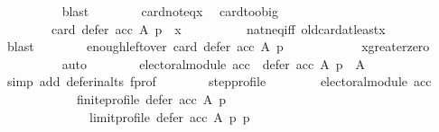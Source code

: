 \begin{isabellebody}
\ \ \ \ \ \ \ \ \isamarkupfalse%
\ blast\isanewline
\ \ \ \ \ \ \isamarkupfalse%
\ card{\isacharunderscore}{\kern0pt}not{\isacharunderscore}{\kern0pt}eq{\isacharunderscore}{\kern0pt}x\ \isamarkupfalse%
\ card{\isacharunderscore}{\kern0pt}too{\isacharunderscore}{\kern0pt}big{\isacharcolon}{\kern0pt}\isanewline
\ \ \ \ \ \ \ \ {\isachardoublequoteopen}card\ {\isacharparenleft}{\kern0pt}defer\ acc\ A\ p{\isacharparenright}{\kern0pt}\ {\isachargreater}{\kern0pt}\ x{\isachardoublequoteclose}\isanewline
\ \ \ \ \ \ \ \ \isamarkupfalse%
\ nat{\isacharunderscore}{\kern0pt}neq{\isacharunderscore}{\kern0pt}iff\ old{\isacharunderscore}{\kern0pt}card{\isacharunderscore}{\kern0pt}at{\isacharunderscore}{\kern0pt}least{\isacharunderscore}{\kern0pt}x\isanewline
\ \ \ \ \ \ \ \ \isamarkupfalse%
\ blast\isanewline
\ \ \ \ \ \ \isamarkupfalse%
\ enough{\isacharunderscore}{\kern0pt}leftover{\isacharcolon}{\kern0pt}\ {\isachardoublequoteopen}card\ {\isacharparenleft}{\kern0pt}defer\ acc\ A\ p{\isacharparenright}{\kern0pt}\ {\isachargreater}{\kern0pt}\ {}{\isachardoublequoteclose}\isanewline
\ \ \ \ \ \ \ \ \isamarkupfalse%
\ x{\isacharunderscore}{\kern0pt}greater{\isacharunderscore}{\kern0pt}zero\isanewline
\ \ \ \ \ \ \ \ \isamarkupfalse%
\ auto\isanewline
\ \ \ \ \ \ \isamarkupfalse%
\ {\isachardoublequoteopen}electoral{\isacharunderscore}{\kern0pt}module\ acc\ {\isasymlongrightarrow}\ {\isacharparenleft}{\kern0pt}defer\ acc\ A\ p{\isacharparenright}{\kern0pt}\ {\isasymsubseteq}\ A{\isachardoublequoteclose}\isanewline
\ \ \ \ \ \ \ \ \isamarkupfalse%
\ {\isacharparenleft}{\kern0pt}simp\ add{\isacharcolon}{\kern0pt}\ defer{\isacharunderscore}{\kern0pt}in{\isacharunderscore}{\kern0pt}alts\ f{\isacharunderscore}{\kern0pt}prof{\isacharparenright}{\kern0pt}\isanewline
\ \ \ \ \ \ \isamarkupfalse%
\ step{\isacharunderscore}{\kern0pt}profile{\isacharcolon}{\kern0pt}\isanewline
\ \ \ \ \ \ \ \ {\isachardoublequoteopen}electoral{\isacharunderscore}{\kern0pt}module\ acc\ {\isasymlongrightarrow}\isanewline
\ \ \ \ \ \ \ \ \ \ \ \ finite{\isacharunderscore}{\kern0pt}profile\ {\isacharparenleft}{\kern0pt}defer\ acc\ A\ p{\isacharparenright}{\kern0pt}\isanewline
\ \ \ \ \ \ \ \ \ \ \ \ \ \ {\isacharparenleft}{\kern0pt}limit{\isacharunderscore}{\kern0pt}profile\ {\isacharparenleft}{\kern0pt}defer\ acc\ A\ p{\isacharparenright}{\kern0pt}\ p{\isacharparenright}{\kern0pt}{\isachardoublequoteclose}\isanewline

\end{isabellebody}
